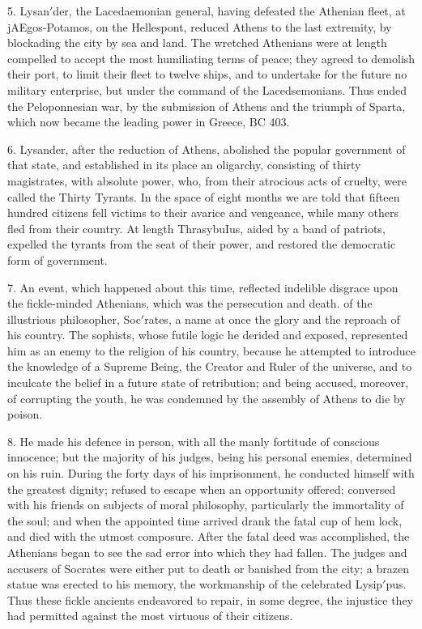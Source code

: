 \documentclass[openany,a4paper]{memoir}
\begin{document}
5. Lysan$'$der, the Lacedaemonian general, having defeated 
the Athenian fleet, at jAEgos-Potamos, on the Hellespont, reduced Athens to the last extremity, by blockading the city 
by sea and land. The wretched Athenians were at length 
compelled to accept the most humiliating terms of peace; 
they agreed to demolish their port, to limit their fleet to 
twelve ships, and to undertake for the future no military 
enterprise, but under the command of the Lacedsemonians. 
Thus ended the Peloponnesian war, by the submission of 
Athens and the triumph of Sparta, which now became the 
leading power in Greece, BC 403. 

6. Lysander, after the reduction of Athens, abolished the 
popular government of that state, and established in its place 
an oligarchy, consisting of thirty magistrates, with absolute 
power, who, from their atrocious acts of cruelty, were called 
the Thirty Tyrants. In the space of eight months we are 
told that fifteen hundred citizens fell victims to their avarice 
and vengeance, while many others fled from their country. 
At length ThrasybuIus, aided by a band of patriots, expelled 
the tyrants from the seat of their power, and restored the 
democratic form of government. 

7. An event, which happened about this time, reflected indelible disgrace upon the fickle-minded Athenians, which was 
the persecution and death. of the illustrious philosopher, 
Soc$'$rates, a name at once the glory and the reproach of his 
country. The sophists, whose futile logic he derided and 
exposed, represented him as an enemy to the religion of his 
country, because he attempted to introduce the knowledge 
of a Supreme Being, the Creator and Ruler of the universe, 
and to inculcate the belief in a future state of retribution; 
and being accused, moreover, of corrupting the youth, he was 
condemned by the assembly of Athens to die by poison. 

8. He made his defence in person, with all the manly fortitude of conscious innocence; but the majority of his judges, 
being his personal enemies, determined on his ruin. During 
the forty days of his imprisonment, he conducted himself with 
the greatest dignity; refused to escape when an opportunity 
offered; conversed with his friends on subjects of moral 
philosophy, particularly the immortality of the soul; and 
when the appointed time arrived drank the fatal cup of hem
lock, and died with the utmost composure. After the fatal 
deed was accomplished, the Athenians began to see the sad 
error into which they had fallen. The judges and accusers 
of Socrates were either put to death or banished from the 
city; a brazen statue was erected to his memory, the workmanship of the celebrated Lysip$'$pus. Thus these fickle ancients endeavored to repair, in some degree, the injustice they 
had permitted against the most virtuous of their citizens. 
\end{document}

